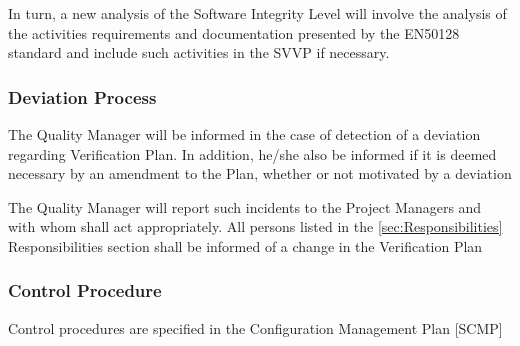 \documentclass{template/openetcs_report}
\begin{document}
In turn, a new analysis of the Software Integrity Level will involve
the analysis of the activities requirements and documentation
presented by the EN50128 standard and include such activities in the
SVVP if necessary. 

\subsubsection{Deviation Process}
The Quality Manager will be informed in the case of detection of a
deviation regarding Verification Plan. In addition, he/she also be
informed if it is deemed necessary by an amendment to the Plan,
whether or not motivated by a deviation 

The Quality Manager will report such incidents to the Project Managers
and with whom shall act appropriately. All persons listed in the
\ref{sec:Responsibilities} Responsibilities section shall be informed
of a change in the Verification Plan 

\subsubsection{Control Procedure}
Control procedures are specified in the Configuration Management Plan [SCMP]
\end{document}
